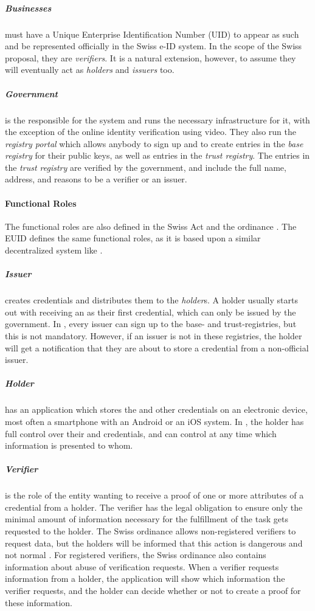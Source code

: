 \subparagraph{Businesses}
must have a Unique Enterprise Identification Number (UID) to appear as such and be represented officially in the Swiss e-ID system.
In the scope of the Swiss proposal, they are \emph{verifiers}.
It is a natural extension, however, to assume they will eventually act as \emph{holders} and \emph{issuers} too.

\subparagraph{Government}
is the responsible for the system and runs the necessary infrastructure for it, with the exception of the online identity verification using video.
They also run the \emph{registry portal} which allows anybody to sign up and to create entries in the \emph{base registry} for their public keys, as well as entries in the \emph{trust registry}.
The entries in the \emph{trust registry} are verified by the government, and include the full name, address, and reasons to be a verifier or an issuer.

\paragraph{Functional Roles}

The functional roles are also defined in the Swiss \eid Act \cite{BGEID24} and the ordinance \cite{VEID25}.
The EUID \cite{EUDI-ARF} defines the same functional roles, as it is based upon a similar decentralized system like \swiyu.


\subparagraph{Issuer} creates credentials and distributes them to the \emph{holder}s.
A holder usually starts out with receiving an \eid as their first credential, which can only be issued by the government.
In \swiyu, every issuer can sign up to the base- and trust-registries, but this is not mandatory.
However, if an issuer is not in these registries, the holder will get a notification that they are about to store a credential from a non-official issuer.

\subparagraph{Holder} has an application which stores the \eid and other credentials on an electronic device, most often a smartphone with an Android or an iOS system.
In \swiyu, the holder has full control over their \eid and credentials, and can control at any time which information is presented to whom.

\subparagraph{Verifier} is the role of the entity wanting to receive a proof of one or more attributes of a credential from a holder.
The verifier has the legal obligation to ensure only the minimal amount of information necessary for the fulfillment of the task gets requested to the holder.
The Swiss ordinance allows non-registered verifiers to request data, but the holders will be informed that this action is dangerous and not normal \cite[Art. 14]{VEID25}.
For registered verifiers, the Swiss ordinance also contains information about abuse of verification requests.
When a verifier requests information from a holder, the application will show which information the verifier requests, and the holder can decide whether or not to create a proof for these information.

